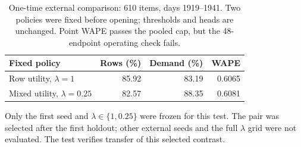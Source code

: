 \begin{table}[H]
\centering\small
\caption{One-time external comparison: 610 items, days 1919--1941. Two policies were fixed before opening; thresholds and heads are unchanged. Point WAPE passes the pooled cap, but the 48-endpoint operating check fails.}
\label{tab:external}
\begin{tabular}{lrrr}
\toprule
Fixed policy & Rows (\%) & Demand (\%) & WAPE\\
\midrule
Row utility, $\lambda=1$ & 85.92 & 83.19 & 0.6065 \\
Mixed utility, $\lambda=0.25$ & 82.57 & 88.35 & 0.6081 \\
\bottomrule
\end{tabular}
\par\smallskip\begin{minipage}{0.97\linewidth}\footnotesize
Only the first seed and $\lambda\in\{1,0.25\}$ were frozen for this test. The pair was selected after the first holdout; other external seeds and the full $\lambda$ grid were not evaluated. The test verifies transfer of this selected contrast.
\end{minipage}
\end{table}
